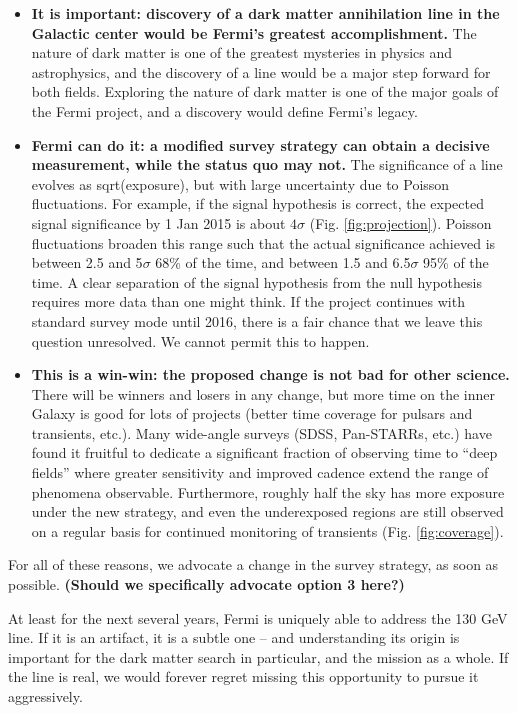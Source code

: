 \documentclass[aps,prd,superscriptaddress,showpacs,nofootinbib,fixlfloat, 12pt]{revtex4-1}
\begin{document}
\begin{itemize}

\item{\bf It is important: discovery of a dark matter annihilation line in the
    Galactic center would be Fermi's greatest accomplishment.}  The nature of
  dark matter is one of the greatest mysteries in physics and astrophysics,
  and the discovery of a line would be a major step forward for both fields.
  Exploring the nature of dark matter is one of the major goals of the Fermi
  project, and a discovery would define Fermi's legacy.

\item{\bf Fermi can do it: a modified survey strategy can obtain a decisive
    measurement, while the status quo may not.}  The significance of a line
  evolves as sqrt(exposure), but with large uncertainty due to Poisson
  fluctuations.  For example, if the signal hypothesis is correct, the
  expected signal significance by 1 Jan 2015 is about $4\sigma$
  (Fig. \ref{fig:projection}).  Poisson fluctuations broaden this range such
  that the actual significance achieved is between 2.5 and
  5$\sigma$ 68\% of the time, and between 1.5 and 6.5$\sigma$ 95\% of the
  time.  A clear separation of the signal hypothesis from the null hypothesis
  requires more data than one might think.  If the project continues with
  standard survey mode until 2016, there is a fair chance that we leave this
  question unresolved.  We cannot permit this to happen.

\item{\bf This is a win-win: the proposed change is not bad for other science.}  There will be winners and
  losers in any change, but more time on the inner Galaxy is good for lots of
  projects (better time coverage for pulsars and transients, etc.).  Many
  wide-angle surveys (SDSS, Pan-STARRs, etc.) have found it fruitful to
  dedicate a significant fraction of observing time to ``deep fields'' where
  greater sensitivity and improved cadence extend the range of phenomena
  observable.  Furthermore, roughly half
  the sky has more exposure under the new strategy, and even the underexposed
  regions are still observed on a regular basis for continued monitoring of
  transients (Fig. \ref{fig:coverage}).

\end{itemize}

For all of these reasons, we advocate a change in the survey strategy, as soon
as possible.
{\bf (Should we specifically advocate option 3 here?)  }


At least for the next several years, Fermi is uniquely able to address the 130
GeV line.  If it is an artifact, it is a subtle one -- and understanding its
origin is important for the dark matter search in
particular, and the mission as a whole.  If the line is real, we would forever
regret missing this opportunity to pursue it aggressively. 

\clearpage

\end{document}
